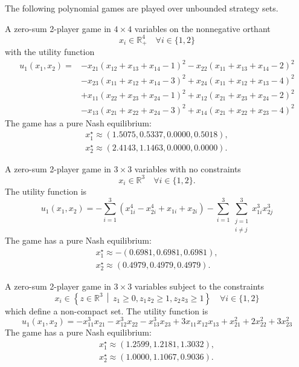 The following polynomial games are played over unbounded strategy sets.

\begin{game}
A zero-sum 2-player game in $4 \times 4$ variables on the nonnegative orthant
\[
x_i \in \mathbb{R}^4_+ \quad \forall i \in \{1,2\}
\]
with the utility function \cite[Example~6.7]{nie.yang.ea:saddle}
\begin{align*}
u_1(x_1, x_2) = &-x_{21}(x_{12} + x_{13} + x_{14} - 1)^2 - x_{22}(x_{11} + x_{13} + x_{14} - 2)^2 \\
    &- x_{23}(x_{11} + x_{12} + x_{14} - 3)^2 + x_{24}(x_{11} + x_{12} + x_{13} - 4)^2 \\
    &+ x_{11}(x_{22} + x_{23} + x_{24} - 1)^2 + x_{12}(x_{21} + x_{23} + x_{24} - 2)^2 \\
    &- x_{13}(x_{21} + x_{22} + x_{24} - 3)^2 + x_{14}(x_{21} + x_{22} + x_{23} - 4)^2
\end{align*}
The game has a pure Nash equilibrium:
\begin{align*}
x_1^\star \approx (1.5075, 0.5337, 0.0000, 0.5018), \\
x_2^\star \approx (2.4143, 1.1463, 0.0000, 0.0000).
\end{align*}
\end{game}

\begin{game}
A zero-sum 2-player game in $3 \times 3$ variables with no constraints
\[
x_i \in \mathbb{R}^3 \quad \forall i \in \{1,2\}.
\]
The utility function \cite[Example~6.8]{nie.yang.ea:saddle} is
\[
u_1(x_1, x_2) = -\sum_{i=1}^{3} (x_{1i}^4 - x_{2i}^4 + x_{1i} + x_{2i}) - \sum_{i=1}^{3} \sum_{\substack{j=1 \\ i \ne j}}^{3} x_{1i}^3 x_{2j}^3
\]
The game has a pure Nash equilibrium:
\begin{align*}
x_1^\star \approx −(0.6981, 0.6981, 0.6981), \\
x_2^\star \approx (0.4979, 0.4979, 0.4979).
\end{align*}
\end{game}

\begin{game}
A zero-sum 2-player game in $3 \times 3$ variables subject to the constraints
\[
x_i \in \left\{z \in \mathbb{R}^3 \,\middle|\, z_1 \geq 0, z_1z_2 \geq 1, z_2z_3 \geq 1 \right\} \quad \forall i \in \{1,2\}
\]
which define a non-compact set. The utility function \cite[Example~6.9]{nie.yang.ea:saddle} is
\[
u_1(x_1, x_2) = -x_{11}^3x_{21} - x_{12}^3x_{22} - x_{13}^3x_{23} + 3x_{11}x_{12}x_{13} + x_{21}^2 + 2x_{22}^2 + 3x_{23}^2
\]
The game has a pure Nash equilibrium:
\begin{align*}
x_1^\star \approx (1.2599, 1.2181, 1.3032), \\
x_2^\star \approx (1.0000, 1.1067, 0.9036).
\end{align*}
\end{game}
